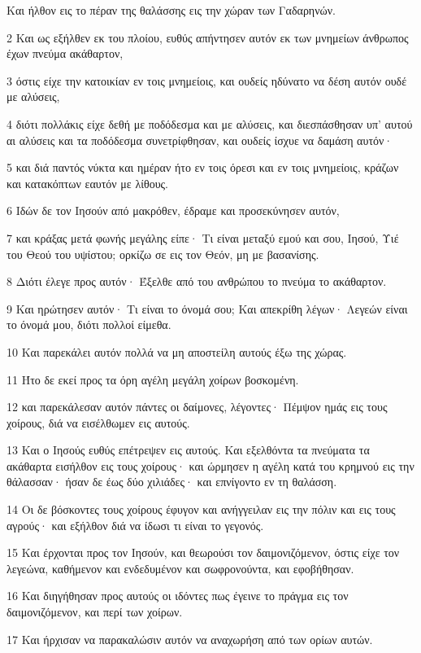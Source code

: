 \par Και ήλθον εις το πέραν της θαλάσσης εις την χώραν των Γαδαρηνών.
\par 2 Και ως εξήλθεν εκ του πλοίου, ευθύς απήντησεν αυτόν εκ των μνημείων άνθρωπος έχων πνεύμα ακάθαρτον,
\par 3 όστις είχε την κατοικίαν εν τοις μνημείοις, και ουδείς ηδύνατο να δέση αυτόν ουδέ με αλύσεις,
\par 4 διότι πολλάκις είχε δεθή με ποδόδεσμα και με αλύσεις, και διεσπάσθησαν υπ' αυτού αι αλύσεις και τα ποδόδεσμα συνετρίφθησαν, και ουδείς ίσχυε να δαμάση αυτόν·
\par 5 και διά παντός νύκτα και ημέραν ήτο εν τοις όρεσι και εν τοις μνημείοις, κράζων και κατακόπτων εαυτόν με λίθους.
\par 6 Ιδών δε τον Ιησούν από μακρόθεν, έδραμε και προσεκύνησεν αυτόν,
\par 7 και κράξας μετά φωνής μεγάλης είπε· Τι είναι μεταξύ εμού και σου, Ιησού, Υιέ του Θεού του υψίστου; ορκίζω σε εις τον Θεόν, μη με βασανίσης.
\par 8 Διότι έλεγε προς αυτόν· Έξελθε από του ανθρώπου το πνεύμα το ακάθαρτον.
\par 9 Και ηρώτησεν αυτόν· Τι είναι το όνομά σου; Και απεκρίθη λέγων· Λεγεών είναι το όνομά μου, διότι πολλοί είμεθα.
\par 10 Και παρεκάλει αυτόν πολλά να μη αποστείλη αυτούς έξω της χώρας.
\par 11 Ήτο δε εκεί προς τα όρη αγέλη μεγάλη χοίρων βοσκομένη.
\par 12 και παρεκάλεσαν αυτόν πάντες οι δαίμονες, λέγοντες· Πέμψον ημάς εις τους χοίρους, διά να εισέλθωμεν εις αυτούς.
\par 13 Και ο Ιησούς ευθύς επέτρεψεν εις αυτούς. Και εξελθόντα τα πνεύματα τα ακάθαρτα εισήλθον εις τους χοίρους· και ώρμησεν η αγέλη κατά του κρημνού εις την θάλασσαν· ήσαν δε έως δύο χιλιάδες· και επνίγοντο εν τη θαλάσση.
\par 14 Οι δε βόσκοντες τους χοίρους έφυγον και ανήγγειλαν εις την πόλιν και εις τους αγρούς· και εξήλθον διά να ίδωσι τι είναι το γεγονός.
\par 15 Και έρχονται προς τον Ιησούν, και θεωρούσι τον δαιμονιζόμενον, όστις είχε τον λεγεώνα, καθήμενον και ενδεδυμένον και σωφρονούντα, και εφοβήθησαν.
\par 16 Και διηγήθησαν προς αυτούς οι ιδόντες πως έγεινε το πράγμα εις τον δαιμονιζόμενον, και περί των χοίρων.
\par 17 Και ήρχισαν να παρακαλώσιν αυτόν να αναχωρήση από των ορίων αυτών.
